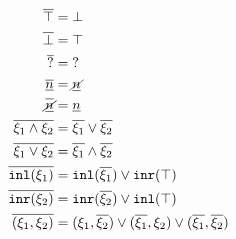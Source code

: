 \begin{figure}
~~
\begin{subequations}
\begin{align}
  \cdual{\ctruth} &= \cfalsity \\
  \cdual{\cfalsity} &= \ctruth \\
  \cdual{\cunknown} &= \cunknown \\
  \cdual{\cnum{n}} &= \cnotnum{n} \\
  \cdual{\cnotnum{n}} &= \cnum{n} \\
  \cdual{\cand{\xi_1}{\xi_2}} &= \cor{\cdual{\xi_1}}{\cdual{\xi_2}} \\
  \cdual{\cor{\xi_1}{\xi_2}} &= \cand{\cdual{\xi_1}}{\cdual{\xi_2}} \\
  \cdual{\cinl{\xi_1}} &= \cor{ \cinl{\cdual{\xi_1}} }{ \cinr{\ctruth} } \\
  \cdual{\cinr{\xi_2}} &= \cor{ \cinr{\cdual{\xi_2}} }{ \cinl{\ctruth} } \\
  \cdual{\cpair{\xi_1}{\xi_2}} &=
  \cor{ \cor{ 
    \cpair{\xi_1}{\cdual{\xi_2}}
  }{
    \cpair{\cdual{\xi_1}}{\xi_2}
  }}{
    \cpair{\cdual{\xi_1}}{\cdual{\xi_2}}
  }
\end{align}
\end{subequations}
\end{figure}

